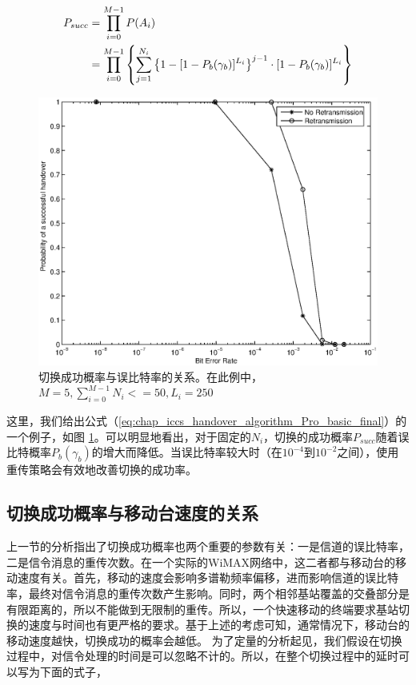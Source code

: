 \begin{align}
\label{eq:chap_iccs_handover_algorithm_Pro_basic_final}
\notag P_{succ}&=\prod_{i=0}^{M-1}P(A_{i})\\
&=\prod_{i=0}^{M-1}\left\{ \sum_{j=1}^{N_{i}}\left\{ 1-[1-P_{b}(\gamma_{b})]^{L_{i}}\right\} ^{j-1} \cdot[1-P_{b}(\gamma_{b})]^{L_{i}}\right\}
\end{align}

\begin{figure}[htbp]
\begin{centering}
\includegraphics[scale=0.6]{iccs_ber_prob}
\par\end{centering}
\caption{切换成功概率与误比特率的关系。在此例中，$M=5,\sum_{i=0}^{M-1}N_i<=50,L_i=250$}
\label{fig:chap_iccs_handover_algorithm_PBER}
\end{figure}
这里，我们给出公式（\ref{eq:chap_iccs_handover_algorithm_Pro_basic_final}）的一个例子，如图 \ref{fig:chap_iccs_handover_algorithm_PBER}。可以明显地看出，对于固定的$N_i$，切换的成功概率$P_{succ}$随着误比特概率$P_b(\gamma_b)$的增大而降低。当误比特率较大时（在$10^{-4}$到$10^{-2}$之间），使用重传策略会有效地改善切换的成功率。

\subsection{切换成功概率与移动台速度的关系}
上一节的分析指出了切换成功概率也两个重要的参数有关：一是信道的误比特率，二是信令消息的重传次数。在一个实际的WiMAX网络中，这二者都与移动台的移动速度有关。首先，移动的速度会影响多谱勒频率偏移，进而影响信道的误比特率，最终对信令消息的重传次数产生影响。同时，两个相邻基站覆盖的交叠部分是有限距离的，所以不能做到无限制的重传。所以，一个快速移动的终端要求基站切换的速度与时间也有更严格的要求。基于上述的考虑可知，通常情况下，移动台的移动速度越快，切换成功的概率会越低。
为了定量的分析起见，我们假设在切换过程中，对信令处理的时间是可以忽略不计的。所以，在整个切换过程中的延时可以写为下面的式子，

